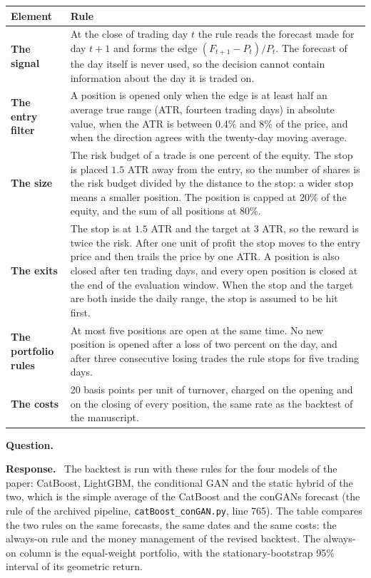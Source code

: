 \documentclass[11pt,a4paper]{article}
\newcommand{\subpoint}[3]{\par\vspace{0.9em}\Needspace{6\baselineskip}%
    \noindent{\bfseries Point #1: #2}\par\nopagebreak\vspace{0.15em}
    \noindent\textbf{Question.}\ \emph{#3}\par\nopagebreak\vspace{0.2em}
    \noindent\textbf{Response.}\ }
\begin{document}
\begin{center}\small
\begin{tabular}{p{}p{}}
\toprule
Element & Rule \\
\midrule
\textbf{The signal} & At the close of trading day $t$ the rule reads the forecast made for day $t+1$ and forms the edge $(F_{t+1}-P_t)/P_t$. The forecast of the day itself is never used, so the decision cannot contain information about the day it is traded on. \\
\textbf{The entry filter} & A position is opened only when the edge is at least half an average true range (ATR, fourteen trading days) in absolute value, when the ATR is between 0.4\% and 8\% of the price, and when the direction agrees with the twenty-day moving average. \\
\textbf{The size} & The risk budget of a trade is one percent of the equity. The stop is placed $1.5$ ATR away from the entry, so the number of shares is the risk budget divided by the distance to the stop: a wider stop means a smaller position. The position is capped at 20\% of the equity, and the sum of all positions at 80\%. \\
\textbf{The exits} & The stop is at $1.5$ ATR and the target at $3$ ATR, so the reward is twice the risk. After one unit of profit the stop moves to the entry price and then trails the price by one ATR. A position is also closed after ten trading days, and every open position is closed at the end of the evaluation window. When the stop and the target are both inside the daily range, the stop is assumed to be hit first. \\
\textbf{The portfolio rules} & At most five positions are open at the same time. No new position is opened after a loss of two percent on the day, and after three consecutive losing trades the rule stops for five trading days. \\
\textbf{The costs} & 20 basis points per unit of turnover, charged on the opening and on the closing of every position, the same rate as the backtest of the manuscript. \\
\bottomrule
\end{tabular}
\end{center}

\subpoint{4.2}{What the money management changes}{}
The backtest is run with these rules for the four models of the paper:
CatBoost, LightGBM, the conditional GAN and the static hybrid of the two,
which is the simple average of the CatBoost and the conGANs forecast (the
rule of the archived pipeline, \texttt{catBoost\_conGAN.py}, line 765).
The table compares the two rules on the same forecasts, the same dates and
the same costs: the always-on rule and the money management of the revised
backtest. The always-on column is the equal-weight portfolio, with the
stationary-bootstrap 95\% interval of its geometric return.
\end{document}
